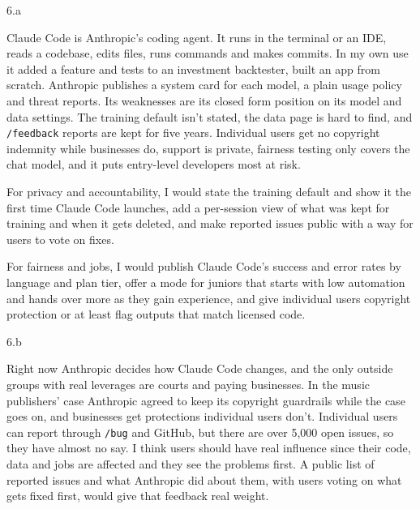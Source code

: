 \LARGE
6.a
\normalsize

\begin{answer}
  Claude Code is Anthropic's coding agent. It runs in the terminal or an IDE, reads a codebase, edits
  files, runs commands and makes commits. In my own
  use it added a feature and tests to an investment backtester, built an app from scratch. Anthropic publishes a system card for each model, a plain usage policy
  and threat reports. Its weaknesses are its closed form position on its model and data settings. The training default
  isn't stated, the data page is hard to find, and \texttt{/feedback} reports are kept for five years.
  Individual users get no copyright indemnity while businesses do, support is private, fairness
  testing only covers the chat model, and it puts entry-level developers most at risk.

  For privacy and accountability, I would state the training default and show it the first time
  Claude Code launches, add a per-session view of what was kept for training and when it gets
  deleted, and make reported issues public with a way for users to vote on fixes.

  For fairness and jobs, I would publish Claude Code's success and error rates by language and plan
  tier, offer a mode for juniors that starts with low automation and hands over more as they gain
  experience, and give individual users copyright protection or at least flag outputs that match
  licensed code.
\end{answer}

\LARGE
6.b
\normalsize

\begin{answer}
  Right now Anthropic decides how Claude Code changes, and the only outside groups with real leverages are
  courts and paying businesses. In the music publishers' case Anthropic agreed to keep its copyright
  guardrails while the case goes on, and businesses get protections individual users don't.
  Individual users can report through \texttt{/bug} and GitHub, but there are over 5,000 open issues,
  so they have almost no say. I think users should have real influence since their code, data and jobs
  are affected and they see the problems first. A public list of reported issues and what Anthropic
  did about them, with users voting on what gets fixed first, would give that feedback real weight.
\end{answer}
\clearpage


